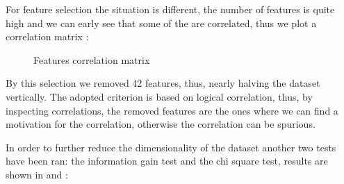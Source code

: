 For feature selection the situation is different, the number of features is quite high and we can early see that some of the are correlated, thus we plot a correlation matrix :

\begin{figure}[H]
    \label{fig:corr_matrix}
    \caption{Features correlation matrix}
\end{figure}



By this selection we removed 42 features, thus, nearly halving the dataset vertically. The adopted criterion is based on logical correlation, thus, by inspecting correlations, the removed features are the ones where we can find a motivation for the correlation, otherwise the correlation can be spurious.

In order to further reduce the dimensionality of the dataset another two tests have been ran: the information gain test and the chi square test, results are shown in  and :

